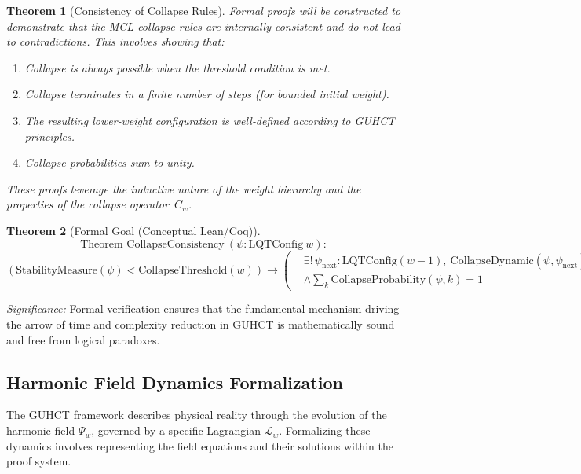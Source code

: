 \documentclass[11pt,a4paper]{article}
\newtheorem{theorem}{Theorem}[section]
\begin{document}
\begin{theorem}[Consistency of Collapse Rules]
Formal proofs will be constructed to demonstrate that the MCL collapse rules are internally consistent and do not lead to contradictions. This involves showing that:
\begin{enumerate}
    \item Collapse is always possible when the threshold condition is met.
    \item Collapse terminates in a finite number of steps (for bounded initial weight).
    \item The resulting lower‑weight configuration is well‑defined according to GUHCT principles.
    \item Collapse probabilities sum to unity.
\end{enumerate}
These proofs leverage the inductive nature of the weight hierarchy and the properties of the collapse operator $C_w$.
\end{theorem}


\begin{theorem}[Formal Goal (Conceptual Lean/Coq)]
\[
\text{Theorem } \mathrm{CollapseConsistency}\ (\psi : \mathrm{LQTConfig}\ w) :
\]
\[
\left( \mathrm{StabilityMeasure}(\psi) < \mathrm{CollapseThreshold}(w) \right) \rightarrow
\left(
\begin{aligned}
  &\exists!\, \psi_{\text{next}} : \mathrm{LQTConfig}(w{-}1),\ \mathrm{CollapseDynamic}(\psi, \psi_{\text{next}}) \\
  &\land \sum\nolimits_k \mathrm{CollapseProbability}(\psi, k) = 1
\end{aligned}
\right)
\]
\end{theorem}



\textit{Significance:} Formal verification ensures that the fundamental mechanism driving the arrow of time and complexity reduction in GUHCT is mathematically sound and free from logical paradoxes.

\subsection{Harmonic Field Dynamics Formalization}
\label{subsec:field_dynamics_formalization}

The GUHCT framework describes physical reality through the evolution of the harmonic field $\Psi_w$, governed by a specific Lagrangian $\mathcal{L}_w$. Formalizing these dynamics involves representing the field equations and their solutions within the proof system.
\end{document}
